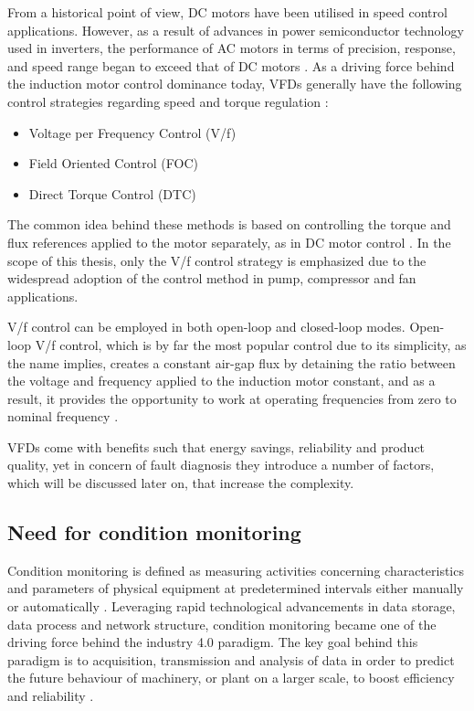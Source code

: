 From a historical point of view, DC motors have been utilised in speed control applications. However, as a result of advances in power semiconductor technology used in inverters, the performance of AC motors in terms of precision, response, and speed range began to exceed that of DC motors \cite{doe2008improving,mikami2011historical}. As a driving force behind the induction motor control dominance today, VFDs generally have the following control strategies regarding speed and torque regulation \cite{weg,danfoss}:

\begin{itemize}
	\item Voltage per Frequency Control (V/f)
	\item Field Oriented Control (FOC)
	\item Direct Torque Control (DTC)
\end{itemize}

The common idea behind these methods is based on controlling the torque and flux references applied to the motor separately, as in DC motor control \cite{faiz2017fault}. In the scope of this thesis, only the V/f control strategy is emphasized due to the widespread adoption of the control method in pump, compressor and fan applications. 

V/f control can be employed in both open-loop and closed-loop modes. Open-loop V/f control, which is by far the most popular control due to its simplicity, as the name implies, creates a constant air-gap flux by detaining the ratio between the voltage and frequency applied to the induction motor constant, and as a result, it provides the opportunity to work at operating frequencies from zero to nominal frequency \cite{bose2002modern}. 

VFDs come with benefits such that energy savings, reliability and product quality, yet in concern of fault diagnosis they introduce a number of factors, which will be discussed later on, that increase the complexity. 

\subsection{Need for condition monitoring}

Condition monitoring is defined as measuring activities concerning characteristics and parameters of physical equipment at predetermined intervals either manually or automatically \cite{en201713306}. Leveraging rapid technological advancements in data storage, data process and network structure, condition monitoring became one of the driving force behind the industry 4.0 paradigm. The key goal behind this paradigm is to acquisition, transmission and analysis of data in order to predict the future behaviour of machinery, or plant on a larger scale, to boost efficiency and reliability \cite{lughofer2019prologue,RUIZSARMIENTO}. 

